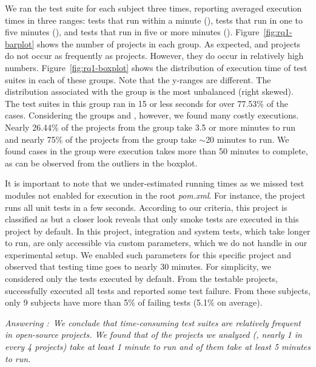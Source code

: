 \documentclass[10pt,journal,compsoc]{IEEEtran}
\begin{document}
We ran the test suite for each subject three times, reporting averaged
execution times in three ranges: tests that run within a minute
(\shortg{}), tests that run in one to five minutes (\medg{}), and
tests that run in five or more minutes (\longg{}). Figure~\ref{fig:rq1-barplot} shows the number of projects in
each group.  As expected, \longg{} and \medg{} projects do not occur
as frequently as \shortg{} projects.  However, they do occur in
relatively high numbers.
Figure~\ref{fig:rq1-boxplot} shows the distribution of execution time of
test suites in each of these groups.
Note that the y-ranges are different.
The distribution associated with the \shortg{} group is the most
unbalanced (right skewed).
The test suites in this group ran in 15 or less seconds for
over 77.53\% of the cases. Considering the groups \medg{} and \longg{},
however, we found many costly executions.  Nearly 26.44\% of the projects
from the \medg{} group take 3.5 or more minutes to run and nearly 75\% of
the projects from the \longg{} group take $\sim$20 minutes to run.  We
found cases in the \longg{} group were execution takes more than 50 minutes
to complete, as can be observed from the outliers in the boxplot.

It is important to note that we under-estimated running times as we missed test modules not enabled for
execution in the root \emph{pom.xml}.  For instance, the project 
runs all unit tests in a few seconds.  According to our criteria, this
project is classified as \shortg{} but a closer look reveals
that only smoke tests are executed in this project by default.
In this project, integration and system tests, which take longer to run, are only accessible via
custom parameters, which we do not handle in our experimental setup.
We enabled such parameters for this specific project and observed that
testing time goes to nearly 30 minutes.  For simplicity, we considered
only the tests executed by default.
From the \numSubjs{} testable projects, \numSubjsPass{} successfully
executed all tests and \numSubjsFail{} reported some test failure.
From these \numSubjsFail{} subjects, only 9 subjects
have more than 5\% of failing tests (5.1\% on average).
\begin{mdframed}
\noindent\textit{Answering \numRQFeasibilityOne{}:}~\emph{We conclude that
    time-consuming test suites are relatively frequent in
    open-source projects.  We found that \percentMedRunning{} of
    the \numSubjs{} projects we analyzed (\ie{}, nearly 1 in every 4
    projects) take at least 1 minute to run and
    \percentLongRunning{} of them take at least 5 minutes to run.}
\end{mdframed}
\end{document}
